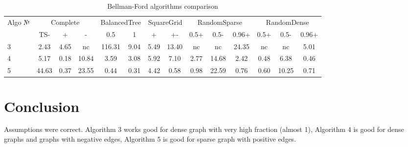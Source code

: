 \begin{table}[H]
\centering

\begin{tabular}{l|ccc|cc|cc|ccc|ccc}  
Algo №& \multicolumn{3}{c}{Complete} & \multicolumn{2}{c}{BalancedTree} & \multicolumn{2}{c}{SquareGrid} & \multicolumn{3}{c}{RandomSparse} & \multicolumn{3}{c}{RandomDense}\\
& TS- & + & - & 0.5 & 1 & + & +- & 0.5+  & 0.5- & 0.96+ & 0.5+ & 0.5- & 0.96+\\
\hline\hline
3 & 2.43 & 4.65 & nc & 116.31 & 9.04 & 5.49 & 13.40 & nc & nc & 24.35 & nc & nc & 5.01 \\  
4 & 5.17 & 0.18 & 10.84 & 3.59 & 3.08 & 5.92 & 7.10 & 2.77 & 14.68 & 2.42 & 0.48  & 6.38  & 0.46 \\
5 & 44.63 & 0.37 & 23.55 & 0.44 & 0.31 & 4.42 & 0.58 & 0.98 & 22.59 & 0.76  & 0.60  & 10.25 & 0.71 \\
\hline
\end{tabular}

\caption{Bellman-Ford algorithms comparison}
\label{graph_description}
\end{table}

\FloatBarrier
\section{Conclusion}

Assumptions were correct. Algorithm 3 works good for dense graph with very high fraction (almost 1), Algorithm 4 is good for dense graphs and graphs with negative edges, Algorithm 5 is good for sparse graph with positive edges. 

\FloatBarrier
